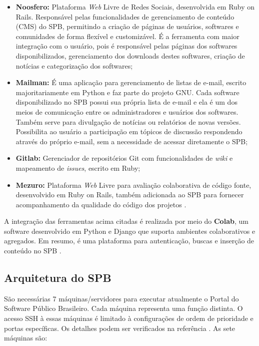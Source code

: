 \begin{itemize}
  \item \textbf{Noosfero:} Plataforma \textit{Web} Livre de Redes Sociais, desenvolvida
	em Ruby on Rails. Responsável pelas funcionalidades de gerenciamento de
	conteúdo (CMS) do SPB, permitindo a criação de páginas de usuários, softwares
	e comunidades de forma flexível e customizável. É a ferramenta com maior
	integração com o usuário, pois é responsável pelas páginas dos softwares
	disponibilizados, gerenciamento dos downloads destes softwares, criação de
	notícias e categorização dos softwares;
  \item \textbf{Mailman:} É uma aplicação para gerenciamento de listas de
	e-mail, escrito majoritariamente em Python e faz parte do projeto GNU. Cada
	software disponibilizado no SPB possui sua própria lista de e-mail e ela é um
	dos meios de comunicação entre os administradores e usuários dos softwares.
	Também serve para divulgação de notícias ou relatórios de novas versões.
	Possibilita ao usuário a participação em tópicos de discussão respondendo
	através do próprio e-mail, sem a necessidade de acessar diretamente o SPB;
	\item \textbf{Gitlab:} Gerenciador de repositórios Git com funcionalidades de
	\textit{wiki} e mapeamento de \textit{issues}, escrito em Ruby;
	\item \textbf{Mezuro:} Plataforma \textit{Web} Livre para avaliação colaborativa de
	código fonte, desenvolvido em Ruby on Rails, também adicionada ao SPB para
	fornecer acompanhamento da qualidade do código dos projetos \cite{aboutSPB}.
\end{itemize}

A integração das ferramentas acima citadas é realizada por meio do
\textbf{Colab}, um software desenvolvido em Python e Django que suporta
ambientes colaborativos e agregados. Em resumo, é uma plataforma para
autenticação, buscas e inserção de conteúdo no SPB \cite{aboutSPB}.

\subsection{Arquitetura do SPB}

São necessárias 7 máquinas/servidores para executar atualmente o Portal do
Software Público Brasileiro. Cada máquina representa uma função distinta. O
acesso SSH à essas máquinas é limitado à configurações de ordem de
prioridade e portas específicas. Os detalhes podem ser verificados na
referência \cite{archSPB}. As sete máquinas são:

